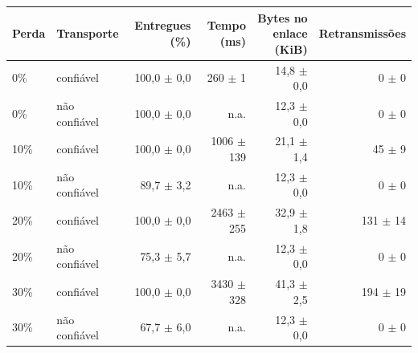 \begin{tabular}{llrrrr}
\toprule
Perda & Transporte & Entregues (\%) & Tempo (ms) & Bytes no enlace (KiB) & Retransmiss\~oes \\
\midrule
0\% & confi\'avel & 100,0 $\pm$ 0,0 & 260 $\pm$ 1 & 14,8 $\pm$ 0,0 & 0 $\pm$ 0 \\
0\% & n\~ao confi\'avel & 100,0 $\pm$ 0,0 & n.a. & 12,3 $\pm$ 0,0 & 0 $\pm$ 0 \\
10\% & confi\'avel & 100,0 $\pm$ 0,0 & 1006 $\pm$ 139 & 21,1 $\pm$ 1,4 & 45 $\pm$ 9 \\
10\% & n\~ao confi\'avel & 89,7 $\pm$ 3,2 & n.a. & 12,3 $\pm$ 0,0 & 0 $\pm$ 0 \\
20\% & confi\'avel & 100,0 $\pm$ 0,0 & 2463 $\pm$ 255 & 32,9 $\pm$ 1,8 & 131 $\pm$ 14 \\
20\% & n\~ao confi\'avel & 75,3 $\pm$ 5,7 & n.a. & 12,3 $\pm$ 0,0 & 0 $\pm$ 0 \\
30\% & confi\'avel & 100,0 $\pm$ 0,0 & 3430 $\pm$ 328 & 41,3 $\pm$ 2,5 & 194 $\pm$ 19 \\
30\% & n\~ao confi\'avel & 67,7 $\pm$ 6,0 & n.a. & 12,3 $\pm$ 0,0 & 0 $\pm$ 0 \\
\bottomrule
\end{tabular}
